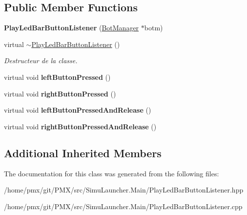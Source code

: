 \subsection*{Public Member Functions}
\begin{DoxyCompactItemize}
\item 
\mbox{\label{classPlayLedBarButtonListener_a1913df8d7d070c88fa669f43eb13f283}} 
{\bfseries Play\+Led\+Bar\+Button\+Listener} (\hyperlink{classBotManager}{Bot\+Manager} $\ast$botm)
\item 
\mbox{\label{classPlayLedBarButtonListener_a2449d4f1fe05849c6cff43206a9fc9f6}} 
virtual \hyperlink{classPlayLedBarButtonListener_a2449d4f1fe05849c6cff43206a9fc9f6}{$\sim$\+Play\+Led\+Bar\+Button\+Listener} ()
\begin{DoxyCompactList}\small\item\em Destructeur de la classe. \end{DoxyCompactList}\item 
\mbox{\label{classPlayLedBarButtonListener_aebc58518b0e2ac9ec10039d5ad10a9c9}} 
virtual void {\bfseries left\+Button\+Pressed} ()
\item 
\mbox{\label{classPlayLedBarButtonListener_a8e584511fa47187362f503e1373cd520}} 
virtual void {\bfseries right\+Button\+Pressed} ()
\item 
\mbox{\label{classPlayLedBarButtonListener_ab3d8f65c464d1beb70044ac1842d109d}} 
virtual void {\bfseries left\+Button\+Pressed\+And\+Release} ()
\item 
\mbox{\label{classPlayLedBarButtonListener_aca90fa50021fb51a74a6dc2c7dd8f5f1}} 
virtual void {\bfseries right\+Button\+Pressed\+And\+Release} ()
\end{DoxyCompactItemize}
\subsection*{Additional Inherited Members}


The documentation for this class was generated from the following files\+:\begin{DoxyCompactItemize}
\item 
/home/pmx/git/\+P\+M\+X/src/\+Simu\+Launcher.\+Main/Play\+Led\+Bar\+Button\+Listener.\+hpp\item 
/home/pmx/git/\+P\+M\+X/src/\+Simu\+Launcher.\+Main/Play\+Led\+Bar\+Button\+Listener.\+cpp\end{DoxyCompactItemize}
